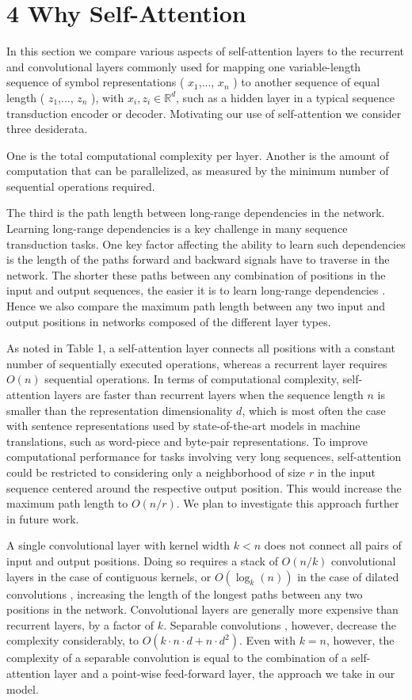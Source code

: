 \documentclass[conference]{IEEEtran}
\begin{document}
\section{4 Why Self-Attention}

In this section we compare various aspects of self-attention layers to the recurrent and convolutional layers commonly used for mapping one variable-length sequence of symbol representations ( $x_1$,..., $x_n$ ) to another sequence of equal length ( $z_1$,..., $z_n$ ), with $x_i, z_i \in \mathbb{R}^d$, such as a hidden layer in a typical sequence transduction encoder or decoder. Motivating our use of self-attention we consider three desiderata.

One is the total computational complexity per layer. Another is the amount of computation that can be parallelized, as measured by the minimum number of sequential operations required.

The third is the path length between long-range dependencies in the network. Learning long-range dependencies is a key challenge in many sequence transduction tasks. One key factor affecting the ability to learn such dependencies is the length of the paths forward and backward signals have to traverse in the network. The shorter these paths between any combination of positions in the input and output sequences, the easier it is to learn long-range dependencies \cite{ref12}. Hence we also compare the maximum path length between any two input and output positions in networks composed of the different layer types.

As noted in Table 1, a self-attention layer connects all positions with a constant number of sequentially executed operations, whereas a recurrent layer requires $O(n)$ sequential operations. In terms of computational complexity, self-attention layers are faster than recurrent layers when the sequence length $n$ is smaller than the representation dimensionality $d$, which is most often the case with sentence representations used by state-of-the-art models in machine translations, such as word-piece \cite{ref38} and byte-pair \cite{ref31} representations. To improve computational performance for tasks involving very long sequences, self-attention could be restricted to considering only a neighborhood of size $r$ in the input sequence centered around the respective output position. This would increase the maximum path length to $O(n/r)$. We plan to investigate this approach further in future work.

A single convolutional layer with kernel width $k < n$ does not connect all pairs of input and output positions. Doing so requires a stack of $O(n/k)$ convolutional layers in the case of contiguous kernels, or $O(\log_k(n))$ in the case of dilated convolutions \cite{ref18}, increasing the length of the longest paths between any two positions in the network. Convolutional layers are generally more expensive than recurrent layers, by a factor of $k$. Separable convolutions \cite{ref6}, however, decrease the complexity considerably, to $O(k \cdot n \cdot d + n \cdot d^2)$. Even with $k = n$, however, the complexity of a separable convolution is equal to the combination of a self-attention layer and a point-wise feed-forward layer, the approach we take in our model.
\end{document}
